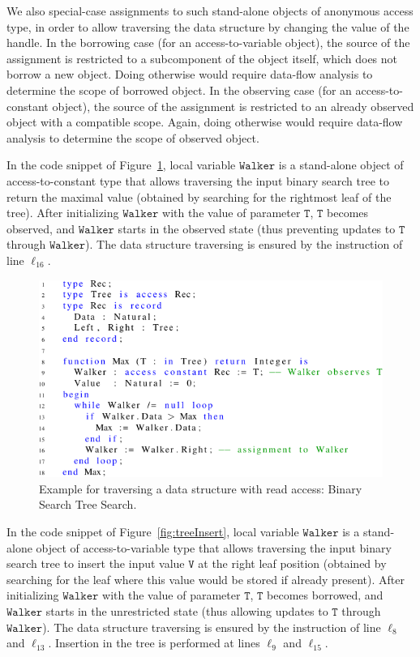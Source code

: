 \documentclass{llncs}
\newcommand\var[1]{\ensuremath{\mathtt{#1}}}
\begin{document}
We also special-case assignments to such stand-alone objects of anonymous access type, in order to allow traversing the data structure by changing the value of the handle.
In the borrowing case (for an access-to-variable object), the source of the assignment is restricted to a subcomponent of the object itself, which does not borrow a new object.
Doing otherwise would require data-flow analysis to determine the scope of borrowed object. In the observing case (for an access-to-constant object), the source of
the assignment is restricted to an already observed object with a compatible scope. Again, doing otherwise would require data-flow analysis to determine the scope of observed object.

In the code snippet of Figure~\ref{fig:maxTree}, local variable \var{Walker} is a stand-alone object of access-to-constant type that allows traversing the input binary
search tree to return the maximal value (obtained by searching for the rightmost leaf of the tree). After initializing \var{Walker} with the value of parameter \var{T},
\var{T} becomes observed, and \var{Walker} starts in the observed state (thus preventing updates to \var{T} through \var{Walker}). The data structure traversing is ensured by the instruction
of line $\ell_{16}$. 

\begin{figure}[htb!]
\centering
  \captionsetup{justification=centering,margin=0.6cm}
   \includegraphics[]{maxTree}
   \caption{Example for traversing a data structure with read access: Binary Search Tree Search.}
   \label{fig:maxTree}
\end{figure}


In the code snippet of Figure~\ref{fig:treeInsert}, local variable \var{Walker} is a stand-alone object of access-to-variable type that allows traversing the input binary
search tree to insert the input value \var{V} at the right leaf position (obtained by searching for the leaf where this value would be stored if already present).
After initializing \var{Walker} with the value of parameter \var{T}, \var{T} becomes borrowed, and \var{Walker} starts in the unrestricted state (thus allowing updates to \var{T} through \var{Walker}).
The data structure traversing is ensured by the instruction of line $\ell_8$ and $\ell_{13}$. Insertion in the tree is performed at lines
$\ell_9$ and $\ell_{15}$.
\end{document}
